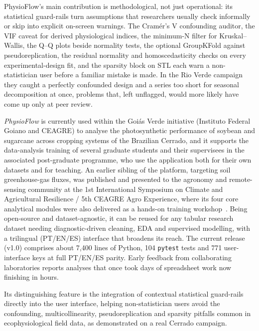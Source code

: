 \documentclass[a4paper,fleqn]{cas-dc}
\begin{document}
PhysioFlow's main contribution is methodological, not just operational: its statistical guard-rails turn assumptions that researchers usually check informally or skip into explicit on-screen warnings. The Cram\'er's V confounding auditor, the VIF caveat for derived physiological indices, the minimum-N filter for Kruskal--Wallis, the Q--Q plots beside normality tests, the optional GroupKFold against pseudoreplication, the residual normality and homoscedasticity checks on every experimental-design fit, and the sparsity block on STL each warn a non-statistician user before a familiar mistake is made. In the Rio Verde campaign they caught a perfectly confounded design and a series too short for seasonal decomposition at once, problems that, left unflagged, would more likely have come up only at peer review.

\emph{PhysioFlow} is currently used within the Goi\'as Verde initiative (Instituto Federal Goiano and CEAGRE) to analyse the photosynthetic performance of soybean and sugarcane across cropping systems of the Brazilian Cerrado, and it supports the data-analysis training of several graduate students and their supervisees in the associated post-graduate programme, who use the application both for their own datasets and for teaching. An earlier sibling of the platform, targeting soil greenhouse-gas fluxes, was published and presented to the agronomy and remote-sensing community at the 1st International Symposium on Climate and Agricultural Resilience / 5th CEAGRE Agro Experience, where its four core analytical modules were also delivered as a hands-on training workshop~\cite{DaSilva2026Goias}. Being open-source and dataset-agnostic, it can be reused for any tabular research dataset needing diagnostic-driven cleaning, EDA and supervised modelling, with a trilingual (PT/EN/ES) interface that broadens its reach. The current release (v1.0) comprises about 7{,}400 lines of Python, 104 \texttt{pytest} tests and 771 user-interface keys at full PT/EN/ES parity. Early feedback from collaborating laboratories reports analyses that once took days of spreadsheet work now finishing in hours.

Its distinguishing feature is the integration of contextual statistical guard-rails directly into the user interface, helping non-statistician users avoid the confounding, multicollinearity, pseudoreplication and sparsity pitfalls common in ecophysiological field data, as demonstrated on a real Cerrado campaign.

\end{document}
